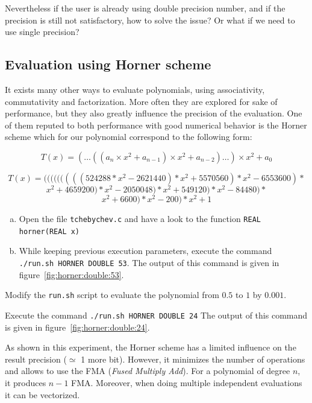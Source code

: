 \documentclass{TP}
\begin{document}
Nevertheless if the user is already using double precision number, and if the precision is still not satisfactory, how to solve the issue? Or what if we need to use single precision?

\FloatBarrier

\subsection{Evaluation using Horner scheme}

It exists many other ways to evaluate polynomials, using associativity, commutativity and factorization. More often they are explored for sake of performance, but they also greatly influence the precision of the evaluation. One of them reputed to both performance with good numerical behavior is the Horner scheme which for our polynomial correspond to the following form:

\[
	T(x) = (\dots((a_n\times x^2 + a_{n-1})\times x^2 + a_{n-2})\dots) \times x^2
    + a_0
\]

$$T(x) = (((((((((524288*x^2-2621440)*x^2+5570560)*x^2-6553600)*$$
$$x^2+4659200)*x^2-2050048)*x^2+549120)*x^2-84480)*$$
$$x^2+6600)*x^2-200)*x^2+1$$

\begin{question}
  \begin{enumerate}[(a)]
  \item Open the file {\tt tchebychev.c} and have a look to the function {\tt REAL horner(REAL x)}
\item While keeping previous execution parameters, execute the command {\tt ./run.sh HORNER DOUBLE 53}.  \newline The output of this command is given in figure~\ref{fig:horner:double:53}.
  \end{enumerate}
\end{question}

\begin{question}
 \item Modify the {\tt run.sh} script to evaluate the polynomial from $0.5$ to $1$ by $0.001$.
\item Execute the command {\tt ./run.sh HORNER DOUBLE 24}  \newline
The output of this command is given in figure~\ref{fig:horner:double:24}.

\end{question}

As shown in this experiment, the Horner scheme has a limited influence on the result precision ($\simeq$ 1 more bit). However, it minimizes the number of operations and allows to use the FMA ({\it Fused Multiply Add}). For a polynomial of degree $n$, it produces $n-1$ FMA. Moreover, when doing multiple independent evaluations it can be vectorized.
\end{document}
